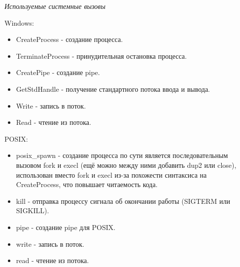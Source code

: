 \textit{Используемые системные вызовы}

Windows:
\begin{itemize}
  \item CreateProcess - создание процесса.
  \item TerminateProcess - принудительная остановка процесса.
  \item CreatePipe - создание pipe.
  \item GetStdHandle - получение стандартного потока ввода и вывода.
  \item Write - запись в поток.
  \item Read - чтение из потока.
\end{itemize}

POSIX:
\begin{itemize}
  \item posix\_spawn - создание процесса по сути является последовательным вызовом fork и execl (ещё можно между ними добавить dup2 или close), использован вместо fork и execl из-за похожести синтаксиса на CreateProcess, что повышает читаемость кода.
  \item kill - отправка процессу сигнала об окончании работы (SIGTERM или SIGKILL).
  \item pipe - создание pipe для POSIX.
  \item write - запись в поток.
  \item read - чтение из потока.
\end{itemize}
